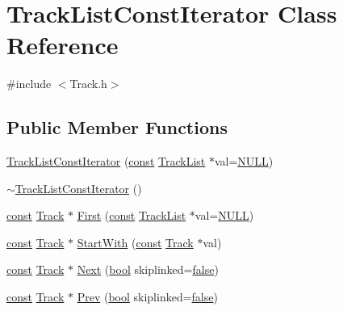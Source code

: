\hypertarget{class_track_list_const_iterator}{}\section{Track\+List\+Const\+Iterator Class Reference}
\label{class_track_list_const_iterator}


{\ttfamily \#include $<$Track.\+h$>$}

\subsection*{Public Member Functions}
\begin{DoxyCompactItemize}
\item 
\hyperlink{class_track_list_const_iterator_a0984bb74eccc55840dee742e5133b450}{Track\+List\+Const\+Iterator} (\hyperlink{getopt1_8c_a2c212835823e3c54a8ab6d95c652660e}{const} \hyperlink{class_track_list}{Track\+List} $\ast$val=\hyperlink{px__mixer_8h_a070d2ce7b6bb7e5c05602aa8c308d0c4}{N\+U\+LL})
\item 
\hyperlink{class_track_list_const_iterator_aeff145b821b25abe5a77453fb88dad87}{$\sim$\+Track\+List\+Const\+Iterator} ()
\item 
\hyperlink{getopt1_8c_a2c212835823e3c54a8ab6d95c652660e}{const} \hyperlink{class_track}{Track} $\ast$ \hyperlink{class_track_list_const_iterator_a293ba71ab85b8390b9f60929cb7ff799}{First} (\hyperlink{getopt1_8c_a2c212835823e3c54a8ab6d95c652660e}{const} \hyperlink{class_track_list}{Track\+List} $\ast$val=\hyperlink{px__mixer_8h_a070d2ce7b6bb7e5c05602aa8c308d0c4}{N\+U\+LL})
\item 
\hyperlink{getopt1_8c_a2c212835823e3c54a8ab6d95c652660e}{const} \hyperlink{class_track}{Track} $\ast$ \hyperlink{class_track_list_const_iterator_aa0b1b52c8ca3bc1a9c6f246b3f937f27}{Start\+With} (\hyperlink{getopt1_8c_a2c212835823e3c54a8ab6d95c652660e}{const} \hyperlink{class_track}{Track} $\ast$val)
\item 
\hyperlink{getopt1_8c_a2c212835823e3c54a8ab6d95c652660e}{const} \hyperlink{class_track}{Track} $\ast$ \hyperlink{class_track_list_const_iterator_ac89a3b2236c0cb6ef0a63d7e8622b6af}{Next} (\hyperlink{mac_2config_2i386_2lib-src_2libsoxr_2soxr-config_8h_abb452686968e48b67397da5f97445f5b}{bool} skiplinked=\hyperlink{mac_2config_2i386_2lib-src_2libsoxr_2soxr-config_8h_a65e9886d74aaee76545e83dd09011727}{false})
\item 
\hyperlink{getopt1_8c_a2c212835823e3c54a8ab6d95c652660e}{const} \hyperlink{class_track}{Track} $\ast$ \hyperlink{class_track_list_const_iterator_a925c804bbe8d0d28e4745609d7ce73db}{Prev} (\hyperlink{mac_2config_2i386_2lib-src_2libsoxr_2soxr-config_8h_abb452686968e48b67397da5f97445f5b}{bool} skiplinked=\hyperlink{mac_2config_2i386_2lib-src_2libsoxr_2soxr-config_8h_a65e9886d74aaee76545e83dd09011727}{false})

\end{DoxyCompactItemize}
